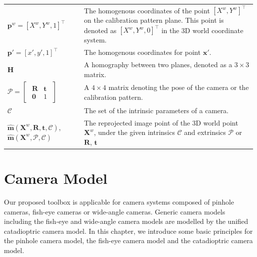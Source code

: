 \documentclass{report}
\begin{document}
\begin{supertabular}{p{0.3\textwidth}p{0.67\textwidth}}
$\mathbf{p}^w = [X^w, Y^w, 1]^\top$ & The homogenous coordinates of the point $[X^w, Y^w]^\top$ on the calibration pattern plane. This point is denoted as $[X^w, Y^w, 0]^\top$ in the 3D world coordinate system. \\[8pt]
$\mathbf{p}' = [x', y', 1]^\top$ & The homogenous coordinates for point $\mathbf{x}'$. \\[8pt]

$\mathbf{H}$ & A homography between two planes, denoted as a $3\times3$ matrix. \\[8pt]

$\mathcal{P} = 
\begin{bmatrix}
	\begin{array}{cc}
	\mathbf{R} & \mathbf{t}\\
	\mathbf{0} & 1
	\end{array}
\end{bmatrix}$ & A $4\times4$ matrix denoting the pose of the camera or the calibration pattern. \\[8pt]

$\mathcal{C}$ & The set of the intrinsic parameters of a camera. \\[8pt]

$\hat{\mathbf{m}}(\mathbf{X}^w, \mathbf{R}, \mathbf{t}, \mathcal{C})$, $\hat{\mathbf{m}}(\mathbf{X}^w, \mathcal{P}, \mathcal{C})$ & The reprojected image point of the 3D world point $\mathbf{X}^w$, under the given intrinsics $\mathcal{C}$ and extrinsics $\mathcal{P}$ or $\mathbf{R}$, $\mathbf{t}$\\[8pt]

\end{supertabular}

\chapter{Camera Model}
Our proposed toolbox is applicable for camera systems composed of pinhole cameras, fish-eye cameras or wide-angle cameras. Generic camera models including the fish-eye and wide-angle camera models are modelled by the unified catadioptric camera model. In this chapter, we introduce some basic principles for the pinhole camera model, the fish-eye camera model and the catadioptric camera model. 
\end{document}
